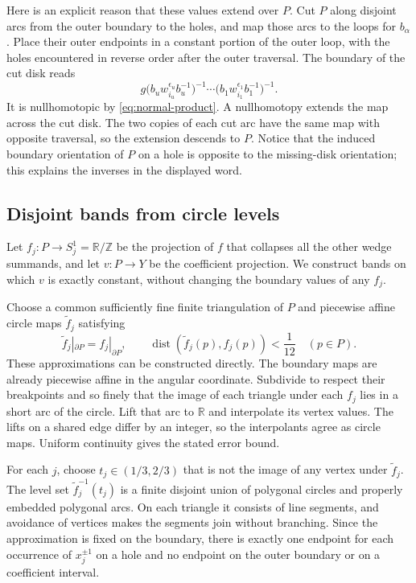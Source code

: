 Here is an explicit reason that these values extend over $P$. Cut $P$
along disjoint arcs from the outer boundary to the holes, and map those
arcs to the loops for $b_\alpha$. Place their outer endpoints in a
constant portion of the outer loop, with the holes encountered in reverse
order after the outer traversal. The boundary of the cut disk reads
\[
 g\bigl(b_u w_{i_u}^{\epsilon_u}b_u^{-1}\bigr)^{-1}
  \cdots
  \bigl(b_1 w_{i_1}^{\epsilon_1}b_1^{-1}\bigr)^{-1}.
\]
It is nullhomotopic by \eqref{eq:normal-product}. A nullhomotopy
extends the map across the cut disk. The two copies of each cut arc
have the same map with opposite traversal, so the extension descends
to $P$. Notice that the induced boundary orientation of $P$ on a hole
is opposite to the missing-disk orientation; this explains the inverses
in the displayed word.

\subsection{Disjoint bands from circle levels}

Let $f_j:P\to S^1_j=\mathbb R/\mathbb Z$ be the projection of $f$
that collapses all the other wedge summands, and let $v:P\to Y$ be
the coefficient projection. We construct bands on which $v$ is exactly
constant, without changing the boundary values of any $f_j$.

Choose a common sufficiently fine finite triangulation of $P$ and
piecewise affine circle maps $\widetilde f_j$ satisfying
\[
 \widetilde f_j|_{\partial P}=f_j|_{\partial P},
 \qquad
 \operatorname{dist}(\widetilde f_j(p),f_j(p))<\frac1{12}
 \quad(p\in P).
\]
These approximations can be constructed directly. The boundary maps are
already piecewise affine in the angular coordinate. Subdivide to respect
their breakpoints and so finely that the image of each triangle under
each $f_j$ lies in a short arc of the circle. Lift that arc to $\mathbb R$
and interpolate its vertex values. The lifts on a shared edge differ
by an integer, so the interpolants agree as circle maps. Uniform
continuity gives the stated error bound.

For each $j$, choose $t_j\in(1/3,2/3)$ that is not the image of any
vertex under $\widetilde f_j$. The level set
$\widetilde f_j^{-1}(t_j)$ is a finite disjoint union of polygonal
circles and properly embedded polygonal arcs. On each triangle it
consists of line segments, and avoidance of vertices makes the segments
join without branching. Since the approximation is fixed on the
boundary, there is exactly one endpoint for each occurrence of
$x_j^{\pm1}$ on a hole and no endpoint on the outer boundary or on a
coefficient interval.

